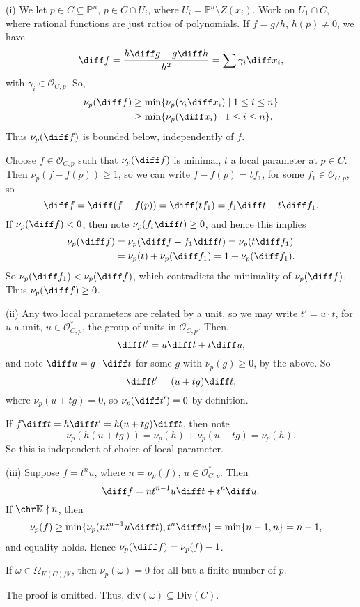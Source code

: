 \documentclass[12pt]{article}
\begin{document}
\begin{proofbox}
	(i) We let $p \in C \subseteq \mathbb{P}^n$, $p \in C \cap U_i$, where $U_i = \mathbb{P}^n \setminus Z(x_i)$. Work on $U_1 \cap C, $ where rational functions are just ratios of polynomials. If $f = g/h$, $h(p) \neq 0$, we have
	\[
	\diff f = \frac{h \diff g - g \diff h}{h^2} = \sum \gamma_i \diff x_i,
	\]
	with $\gamma_i \in \mathcal{O}_{C, p}$. So,
	\begin{align*}
		\nu_p(\diff f) & \geq \min\{ \nu_p(\gamma_i \diff x_i) \mid 1 \leq i \leq n\} \\
			       &\geq \min \{ \nu_p(\diff x_i) \mid 1 \leq i \leq n \}.
	\end{align*}
	Thus $\nu_p(\diff f)$ is bounded below, independently of $f$.

	Choose $f \in \mathcal{O}_{C, p}$ such that $\nu_p(\diff f)$ is minimal, $t$ a local parameter at $p \in C$. Then $\nu_p(f - f(p)) \geq 1$, so we can write $f - f(p) = t f_1$, for some $f_1 \in \mathcal{O}_{C, p}$, so
	\[
	\diff f=  \diff(f - f(p)) = \diff (t f_1) = f_1 \diff t + t \diff f_1.
	\]
	If $\nu_p(\diff f) < 0$, then note $\nu_p(f_i \diff t) \geq 0$, and hence this implies
	\begin{align*}
		\nu_p(\diff f) &= \nu_p(\diff f - f_1 \diff t) = \nu_p(t \diff f_1) \\
			       &= \nu_p(t) + \nu_p(\diff f_1) = 1 + \nu_p(\diff f_1).
	\end{align*}
	So $\nu_p( \diff f_1) < \nu_p (\diff f)$, which contradicts the minimality of $\nu_p(\diff f)$. Thus $\nu_p(\diff f) \geq 0$.

	(ii) Any two local parameters are related by a unit, so we may write $t' = u \cdot t$, for $u$ a unit, $u \in \mathcal{O}_{C, p}^\ast$, the group of units in $\mathcal{O}_{C, p}$. Then,
	\[
	\diff t' = u \diff t + t \diff u,
	\]
	and note $\diff u = g \cdot \diff t$ for some $g$ with $\nu_p(g) \geq 0$, by the above. So
	\[
	\diff t' = (u + t g) \diff t,
	\]
	where $\nu_p(u + tg) = 0$, so $\nu_p(\diff t') = 0$ by definition.

	If $f \diff t = h \diff t' = h(u + tg) \diff t$, then note
	\[
	\nu_p(h(u + tg)) = \nu_p(h) + \nu_p(u + tg) = \nu_p(h).
	\]
	So this is independent of choice of local parameter.

	(iii) Suppose $f = t^n u$, where $n = \nu_p(f)$, $u \in \mathcal{O}_{C, p}^\ast$. Then
	\[
	\diff f = n t^{n-1} u \diff t + t^n \diff u.
	\]
	If $\chr \mathbb{K} \nmid n$, then
	\begin{align*}
		\nu_p(f) &\geq \min \{ \nu_p(n t^{n-1} u \diff t), t^n \diff u \} = \min\{n-1, n\} = n-1,
	\end{align*}
	and equality holds. Hence $\nu_p(\diff f) = \nu_p(f) - 1$.
\end{proofbox}

\begin{proposition}
	If $\omega \in \Omega_{K(C)/\mathbb{K}}$, then $\nu_p(\omega) = 0$ for all but a finite number of $p$.
\end{proposition}

The proof is omitted. Thus, $\mathrm{div}(\omega) \subseteq \mathrm{Div}(C)$.


\newpage

\printindex
\end{document}
